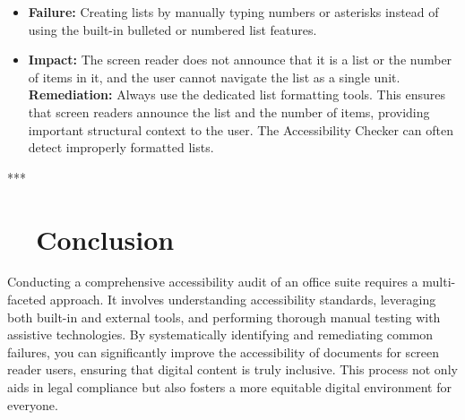 \begin{itemize}
	\item \textbf{Failure:} Creating lists by manually typing numbers or asterisks instead of using the built-in bulleted or numbered list features.
	\item \textbf{Impact:} The screen reader does not announce that it is a list or the number of items in it, and the user cannot navigate the list as a single unit.
	      \textbf{Remediation:} Always use the dedicated list formatting tools. This ensures that screen readers announce the list and the number of items, providing important structural context to the user. The Accessibility Checker can often detect improperly formatted lists.
\end{itemize}

***

\section{~~Conclusion}
\label{sec:conclusion}

Conducting a comprehensive accessibility audit of an office suite requires a multi-faceted approach. It involves understanding accessibility standards, leveraging both built-in and external tools, and performing thorough manual testing with assistive technologies. By systematically identifying and remediating common failures, you can significantly improve the accessibility of documents for screen reader users, ensuring that digital content is truly inclusive. This process not only aids in legal compliance but also fosters a more equitable digital environment for everyone.
